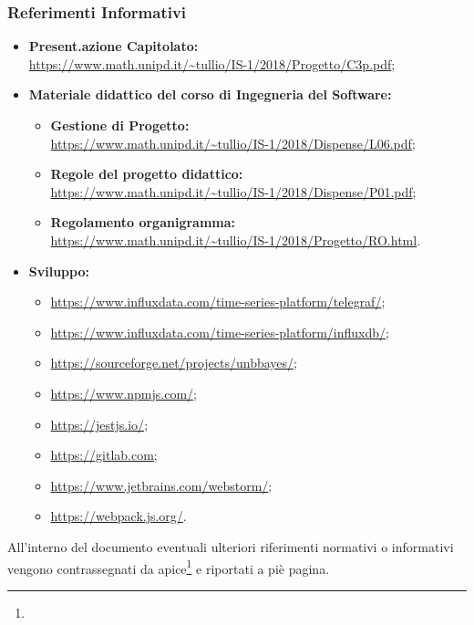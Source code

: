 \subsubsection{Referimenti Informativi}
\begin{itemize}
\item \textbf{Present.azione Capitolato:}\\ \url{https://www.math.unipd.it/~tullio/IS-1/2018/Progetto/C3p.pdf};
\item \textbf{Materiale didattico del corso di Ingegneria del Software:}
	\begin{itemize}
	\item \textbf{Gestione di Progetto:}\\ \url{https://www.math.unipd.it/~tullio/IS-1/2018/Dispense/L06.pdf};
	\item \textbf{Regole del progetto didattico:}\\ \url{https://www.math.unipd.it/~tullio/IS-1/2018/Dispense/P01.pdf};
	\item \textbf{Regolamento organigramma:}\\ \url{https://www.math.unipd.it/~tullio/IS-1/2018/Progetto/RO.html}.
	\end{itemize}
\item \textbf{Sviluppo:}
	\begin{itemize}
	\item \url{https://www.influxdata.com/time-series-platform/telegraf/};
	\item \url{https://www.influxdata.com/time-series-platform/influxdb/};
	\item \url{https://sourceforge.net/projects/unbbayes/};
	\item \url{https://www.npmjs.com/};
	\item \url{https://jestjs.io/};
	\item \url{https://gitlab.com};
	\item \url{https://www.jetbrains.com/webstorm/};
	\item \url{https://webpack.js.org/}.
	\end{itemize}
\end{itemize}

All'interno del documento eventuali ulteriori riferimenti normativi o informativi vengono contrassegnati da apice\footnote{} e riportati a piè pagina.